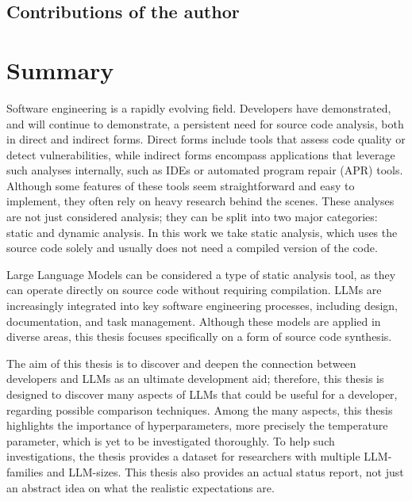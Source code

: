 \documentclass[12pt,a4paper]{extarticle}
\begin{document}
\subsection*{Contributions of the author}




\section*{Summary}

Software engineering is a rapidly evolving field.
Developers have demonstrated, and will continue to demonstrate, a persistent need for source code analysis, both in direct and indirect forms.
Direct forms include tools that assess code quality or detect vulnerabilities, while indirect forms encompass applications that leverage such analyses internally, such as IDEs or automated program repair (APR) tools.
Although some features of these tools seem straightforward and easy to implement, they often rely on heavy research behind the scenes.
These analyses are not just considered analysis; they can be split into two major categories: static and dynamic analysis.
In this work we take static analysis, which uses the source code solely and usually does not need a compiled version of the code.

Large Language Models can be considered a type of static analysis tool, as they can operate directly on source code without requiring compilation.
LLMs are increasingly integrated into key software engineering processes, including design, documentation, and task management.
Although these models are applied in diverse areas, this thesis focuses specifically on a form of source code synthesis.

The aim of this thesis is to discover and deepen the connection between developers and LLMs as an ultimate development aid; therefore, this thesis is designed to discover many aspects of LLMs that could be useful for a developer, regarding possible comparison techniques.
Among the many aspects, this thesis highlights the importance of hyperparameters, more precisely the temperature parameter, which is yet to be investigated thoroughly.
To help such investigations, the thesis provides a dataset for researchers with multiple LLM-families and LLM-sizes. 
This thesis also provides an actual status report, not just an abstract idea on what the realistic expectations are.

\vspace*{3em}
\end{document}
